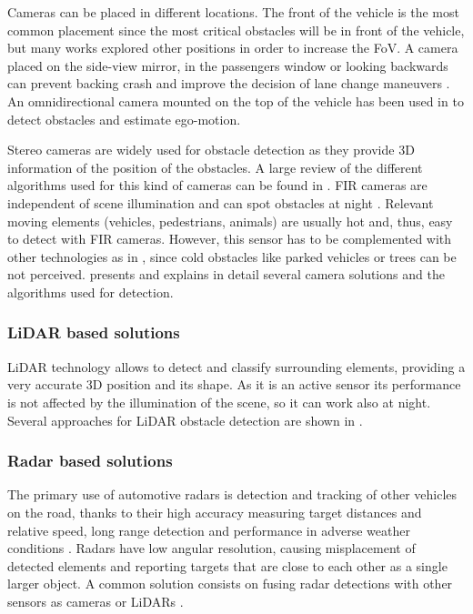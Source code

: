 \documentclass[journal]{IEEEtran}
\begin{document}
Cameras can be placed in different locations. The front of the vehicle is 
the most common placement since the most critical obstacles will be in front of 
the vehicle, but many works explored other positions in order to increase the
FoV. 
A camera placed on the side-view mirror, in the 
passengers window \cite{chang2008real} or looking backwards \cite{suhr2019rearview}
can prevent backing crash and
improve the decision of lane change maneuvers \cite{alonso2008lane, 
song2007lateral, blanc2007larasidecam}. 
An omnidirectional camera mounted
on the top of the vehicle has been used in \cite{gandhi2006vehicle}
to detect obstacles and estimate ego-motion.

Stereo cameras are widely used for obstacle detection as they provide 3D 
information of the position of the obstacles. A large review of the different 
algorithms used for this kind of cameras can be found in \cite{bernini2014real}.
FIR cameras are independent of scene illumination and can spot obstacles at
night \cite{olmeda2013pedestrian}. Relevant moving elements (vehicles, 
pedestrians, animals) are usually hot and, thus, easy to detect with FIR 
cameras. However, this sensor has to be complemented with other technologies
as in \cite{krotosky2007color}, since cold obstacles like parked vehicles or
trees can be not perceived.
\cite{sivaraman2013looking} presents and explains in detail several camera
solutions and the algorithms used for detection.

\subsubsection{LiDAR based solutions}
LiDAR technology allows to detect and classify surrounding elements, providing
a very accurate 3D position and its shape. 
As it is an active sensor its performance is not affected by the illumination 
of the scene, so it can work also at night. Several approaches for LiDAR 
obstacle detection are shown in \cite{li2016vehicle}.

\subsubsection{Radar based solutions}
The primary use of automotive radars is detection and tracking of other 
vehicles on the road, thanks to their high accuracy measuring target 
distances and relative speed, long range detection and performance in adverse 
weather conditions \cite{blanc2004obstacle}. 
Radars have low angular resolution, causing misplacement of detected elements 
and reporting targets that are close to each other as a single larger object.
A common solution consists on fusing radar detections with other sensors as 
cameras \cite{garcia2012data} or LiDARs \cite{gohring2011radar}.
\end{document}
